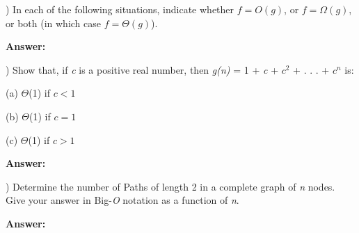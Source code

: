 \documentclass{article}
\begin{document}

\vspace{.2in}


\vspace{.2in}
) In each of the following situations, indicate whether $f  = O(g)$, or $f = \Omega(g)$, 
\indent or both (in which case $f = \Theta(g)$).

\vspace{.1in}
{\bf Answer:}


\vspace{.5in}
) Show that, if \textit{c} is a positive real number, then \textit{g(n)} = 1 + \textit{c} + $c^2$ + . . . + 
\indent$c^n$ is:

\vspace{.1in}
\indent (a) $\Theta$(1) if $c < 1$

\indent (b) $\Theta$(1) if $c = 1$

\indent (c) $\Theta$(1) if $c > 1$

\vspace{.1in}
{\bf Answer:}



\vspace{.5in}
) Determine the number of Paths of length 2 in a complete graph of \textit{n} nodes.
\indent Give your answer in Big-\textit{O} notation as a function of \textit{n}.

\vspace{.1in}
{\bf Answer:}
\end{document}
